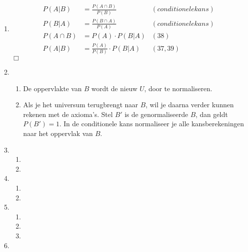 \documentclass{article}
\begin{document}
\begin{enumerate}
\begin{enumerate}
        \end{enumerate}

    \item
        \begin{align}
            P(A|B) &= \frac{P(A \cap B)}{P(B)} & (conditionele kans)\\
            P(B|A) &= \frac{P(B \cap A)}{P(A)} & (conditionele kans)\\
            P(A \cap B) &= P(A) \cdot P(B|A) & (38)\\
            P(A|B) &= \frac{P(A)}{P(B)} \cdot P(B|A) & (37, 39)
        \end{align}
        $\Box$

    \item
        \begin{enumerate}
            \item
                De oppervlakte van $B$ wordt de nieuw $U$, door te normaliseren.

            \item
                Als je het universum terugbrengt naar $B$, wil je daarna verder
                kunnen rekenen met de axioma's. Stel $B'$ is de genormaliseerde
                $B$, dan geldt $P(B')=1$. In de conditionele kans normaliseer je
                alle kansberekeningen naar het oppervlak van $B$.

        \end{enumerate}

    \item
        \begin{enumerate}
            \item

            \item


        \end{enumerate}

    \item
        \begin{enumerate}
            \item
            \item
        \end{enumerate}

    \item
        \begin{enumerate}
            \item
            \item
            \item
        \end{enumerate}

    \item

\end{enumerate}
\end{document}
